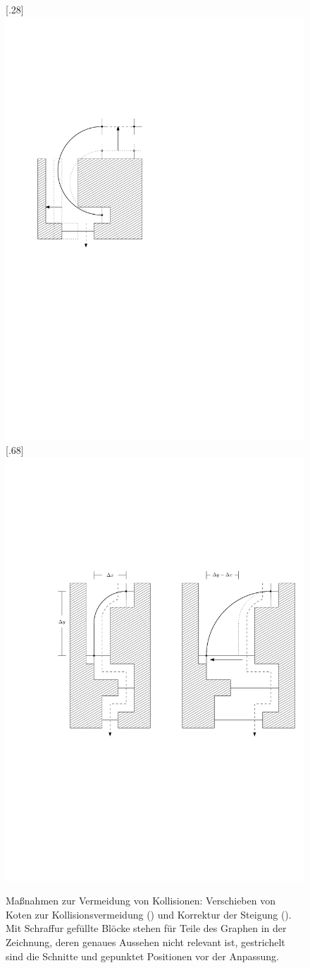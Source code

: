 \documentclass[a4paper]{scrreprt}
\theoremstyle{definition}
\begin{document}
\begin{figure}[h]
        \centering
       [.28\textwidth]
            {\includegraphics[width=.28\textwidth]{accomodate_C_edge}}
        \quad
       [.68\textwidth]
            {\includegraphics[width=.68\textwidth]{cut_L_slope_correction}}
 
        \caption{Maßnahmen zur Vermeidung von Kollisionen: Verschieben von Koten zur Kollisionsvermeidung () und Korrektur der Steigung (). Mit Schraffur gefüllte Blöcke stehen für Teile des Graphen in der Zeichnung, deren genaues Aussehen nicht relevant ist, gestrichelt sind die Schnitte und gepunktet Positionen vor der Anpassung.}
        \label{fig:collisionAvoidanceAndSlopeCorrection}
\end{figure}
\end{document}
